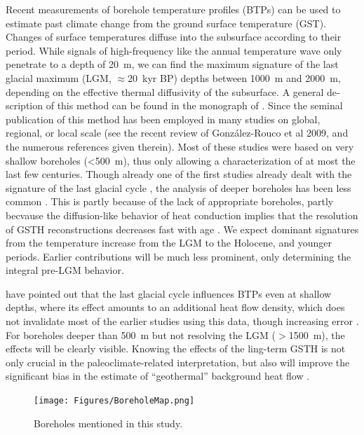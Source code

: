 \documentclass[cp]{copernicus}
\begin{document}
Recent measurements of borehole temperature profiles (BTPs) can be used to estimate past 
climate change from the ground surface temperature (GST). Changes of surface temperatures
diffuse into the sub­surface according to their period. While signals of high-frequency 
like the annual temperature wave only pene­trate to a depth of 20~m, we can find the maximum
signature of the last glacial maximum (LGM, $\approx$20~kyr BP) depths between 1000~m and 2000~m, 
depending on the effective thermal diffusivity of the subsurface. A general de­scription of this 
method can be found in the monograph of \citet{Bodri2007a}. Since the seminal publi­cation of 
\citet{Lachenbruch1986a} this method has been employed in many studies on global, regional, or local 
scale (see the recent review of González-Rouco et al 2009, and the numerous references given 
therein). Most of these studies were based on very shallow boreholes (<500~m), thus only allowing a 
characterization of at most the last 
few centuries. Though already one of the first studies already dealt with the signature of the last 
glacial cycle \citep{Hotchkiss1934a}, the analysis of deeper boreholes has been less common 
\citep{Demezhko2012a,Kukkonen2011a,Kukkonen2011b,Chouinard2009a,Majorowicz2008a,Rath2007a,
Mottaghy2006a,Clauser1995a}. This is partly because of the lack of appropriate boreholes, partly 
becvause the diffusion-like behavior of heat conduction implies that the resolution of GSTH 
reconstructions decreases fast with age \cite[e.g.][]{Demezhko2001a}. We expect dominant signatures 
from the temperature increase from the LGM to the Holocene, and younger periods. Earlier 
contributions will be much less prominent, only determining the integral pre-LGM behavior. 

\citet{Rath2012a} have pointed out that the last glacial cycle influences BTPs even at shallow 
depths, where its effect amounts to an additional heat flow density, which does not invalidate most 
of the earlier studies using this data, though increasing error \citep{Beltrami2011a, Rath2012a}. 
For boreholes deeper than 500~m but not resolving the LGM ($>$1500~m), the effects will be clearly 
visible. Knowing the effects of the ling-term GSTH is not only crucial in the paleoclimate-related 
interpretation, but also will improve the significant bias in the estimate of ``geothermal'' 
background heat­ flow \cite[e.g.][]{Westaway2013a,Majorowicz2011a,Slagstad2009a}. 

\begin{figure} 
\begin{center}
\texttt{[image: Figures/BoreholeMap.png]} 
\caption{Boreholes mentioned in this study.}
\end{center}
\end{figure}
\end{document}
